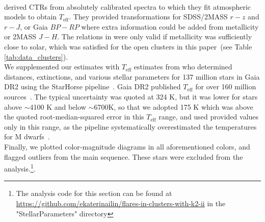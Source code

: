\documentclass{aa}
\begin{document}
\\
\citet{mann_how_2015} derived CTRs from absolutely calibrated spectra to which they fit atmospheric models to obtain $T_\mathrm{eff}$. 
They provided transformations for SDSS/2MASS $r-z$ and $r-J$, or Gaia $BP-RP$ where extra information could be added from metallicity or 2MASS $J-H$. The relations in \citet{mann_how_2015} were only valid if metallicity was sufficiently close to solar, which was satisfied for the open clusters in this paper~(see Table \ref{tab:data_clusters}). 
\\
We supplemented our estimates with $T_\mathrm{eff}$ estimates from \citet{anders_starhorse_2019} who determined distances, extinctions, and various stellar parameters for 137 million stars in Gaia DR2 using the StarHorse pipeline~\citep{queiroz_starhorse_2018}.
Gaia DR2 published $T_\mathrm{eff}$ for over 160 million sources~\citep{gaia2018}. The typical uncertainty was quoted at 324 K, but it was lower for stars above $\sim$4100 K and below $\sim$6700K, so that we adopted 175 K which was above the quoted root-median-squared error in this $T_\mathrm{eff}$ range, and used provided values only in this range, as the pipeline systematically overestimated the temperatures for M dwarfs~\citep{andrae_gaiaapsis_2018,kesseli2019}. 
\\ 
Finally, we plotted color-magnitude diagrams in all aforementioned colors, and flagged outliers from the main sequence. These stars were excluded from the analysis.\footnote{The analysis code for this section can be found at \url{https://github.com/ekaterinailin/flares-in-clusters-with-k2-ii} in the "StellarParameters" directory}.

\end{document}
